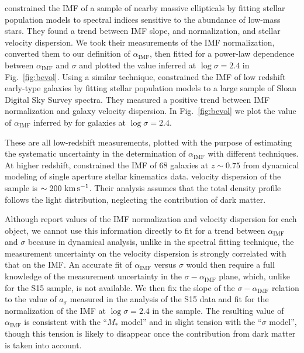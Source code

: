 \documentclass[usenatbib]{mnras}
\def\aimf{\alpha_{\mathrm{IMF}}}
\def\Fref#1{Fig.~\ref{#1}\xspace}
\begin{document}
\citet{CvD12} constrained the IMF of a sample of nearby massive
ellipticals by fitting stellar population models to spectral indices
sensitive to the abundance of low-mass stars.  They found a trend
between IMF slope, and normalization, and stellar velocity
dispersion. We took their measurements of the IMF normalization,
converted them to our definition of $\aimf$, then fitted
for a power-law dependence between $\aimf$ and $\sigma$ and plotted
the value inferred at $\log{\sigma}=2.4$ in \Fref{fig:bevol}.  Using a
similar technique, \citet{Spi++14} constrained the IMF of low redshift
early-type galaxies by fitting stellar population models to a large
sample of Sloan Digital Sky Survey spectra.  They measured a positive
trend between IMF normalization and galaxy velocity dispersion. In
\Fref{fig:bevol} we plot the value of $\aimf$ inferred by
\citet{Spi++14} for galaxies at $\log{\sigma} = 2.4$.

These are all low-redshift measurements, plotted with the purpose of
estimating the systematic uncertainty in the determination of $\aimf$
with different techniques.  At higher redshift, \citet{S+C14}
constrained the IMF of 68 galaxies at $z\sim0.75$ from dynamical
modeling of single aperture stellar kinematics data. %
velocity dispersion of the \citet{S+C14} sample is $\sim
200~\rm{km\,}\rm{s}^{-1}$.  Their analysis assumes that the total
density profile follows the light distribution, neglecting the
contribution of dark matter.

Although \citet{S+C14} report values of the IMF normalization and
velocity dispersion for each object, we cannot use this information
directly to fit for a trend between $\aimf$ and $\sigma$ because in
dynamical analysis, unlike in the spectral fitting technique, the
measurement uncertainty on the velocity dispersion is strongly
correlated with that on the IMF.  An accurate fit of
$\aimf$ versus $\sigma$ would then require a full knowledge of the
measurement uncertainty in the $\sigma-\aimf$ plane, which, unlike for the S15 sample, is not
available.  We then fix the slope of the $\sigma-\aimf$ relation to
the value of $a_\sigma$ measured in the analysis of the S15 data and fit for the
normalization of the IMF at $\log{\sigma}=2.4$ in the \citet{S+C14}
sample.  The resulting value of $\aimf$ is consistent with the ``$M_*$
model'' and in slight tension with the ``$\sigma$ model'', though this
tension is likely to disappear once the contribution from dark matter
is taken into account.

\end{document}
